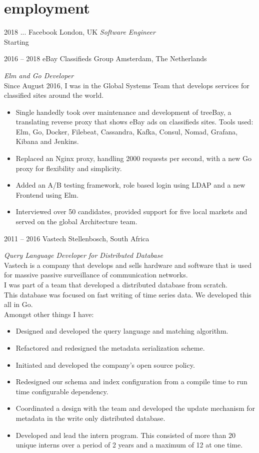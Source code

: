 \documentclass[]{friggeri-cv-a4} %
\begin{document}
\section{employment}
\begin{entrylist}

\entry
{2018 ...}
{Facebook}
{London, UK}
{\emph{Software Engineer} \\
Starting
}

\entry
{2016 -- 2018}
{eBay Classifieds Group}
{Amsterdam, The Netherlands}
{\emph{Elm and Go Developer} \\
Since August 2016, I was in the Global Systems Team that develops services for classified sites around the world.
\begin{itemize}
\item Single handedly took over maintenance and development of treeBay, a translating reverse proxy that shows eBay ads on classifieds sites.
      Tools used: Elm, Go, Docker, Filebeat, Cassandra, Kafka, Consul, Nomad, Grafana, Kibana and Jenkins.
\item Replaced an Nginx proxy, handling 2000 requests per second, with a new Go proxy for flexibility and simplicity.
\item Added an A/B testing framework, role based login using LDAP and a new Frontend using Elm.
\item Interviewed over 50 candidates, provided support for five local markets and served on the global Architecture team.
\end{itemize}
}

\entry
{2011 -- 2016}
{Vastech}
{Stellenbosch, South Africa}
{\emph{Query Language Developer for Distributed Database} \\
Vastech is a company that develops and sells hardware and software that is used for massive passive surveillance of communication networks. \\
I was part of a team that developed a distributed database from scratch. \\
This database was focused on fast writing of time series data.  We developed this all in Go. \\
Amongst other things I have: \\
\begin{itemize}
\item Designed and developed the query language and matching algorithm.
\item Refactored and redesigned the metadata serialization scheme.
\item Initiated and developed the company's open source policy.
\item Redesigned our schema and index configuration from a compile time to run time configurable dependency.
\item Coordinated a design with the team and developed the update mechanism for metadata in the write only distributed database.
\item Developed and lead the intern program. This consisted of more than 20 unique interns over a period of 2 years and a maximum of 12 at one time.
\end{itemize}
}


\end{entrylist}
\end{document}
